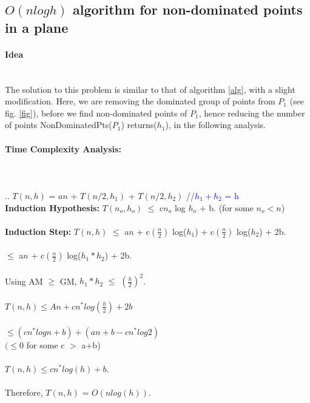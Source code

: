 \documentclass[pdftex,a4paper,12pt]{report}
\begin{document}
\newpage

\subsection {\textbf{$O(n logh)$} algorithm for non-dominated points in a plane}
\paragraph{Idea} \makebox[2pt]{}\\
The solution to this problem is similar to that of algorithm \ref{alg}, with a slight modification.
Here, we are removing the dominated group of points from $P_1$ (see fig. \ref{fig}), before we find non-dominated points of $P_1$,
hence reducing the number of points NonDominatedPts($P_1$) returns($h_1$), in the following analysis. 

\paragraph{Time Complexity Analysis:}\makebox[2pt]{}\\\\..
$T(n,h)$ = $an$ + $T(n/2,h_1)$ + $T(n/2,h_2)$ 		\textcolor{blue}{//$h_1+h_2$ = h}\\
\textbf{Induction Hypothesis:} $T(n_o, h_o)$ $\leq$ c$n_o$ log $h_o$ + b. (for some $n_o < n$) \\\\
\textbf{Induction Step:} $T(n, h)$ $\leq$ a$n$ + c$(\frac{n}{2})$ log($h_1$) + c$(\frac{n}{2})$ log($h_2$) + 2b. \\\\
\makebox[100pt]{} $\leq$ a$n$ + c$(\frac{n}{2})$ log($h_1 * h_2$) + 2b.\\\\
Using AM $\geq$ GM, $h_1*h_2$ $\leq$ $(\frac{h}{2})^2$.\\\\
\makebox[80pt]{} $T(n,h) \leq An + cn^*log(\frac{h}{2}) + 2b$ \\\\
\makebox[80pt]{} $\leq(cn^*logn + b) + (an + b - cn^*log2)$\\
\makebox[200pt]{} $(\leq 0$ for some c $>$ a+b)\\\\
\makebox[80pt]{} $T(n,h) \leq cn^*log(h) + b.$\\\\

Therefore, $T(n,h)$ = $O(n log(h))$.
\end{document}

